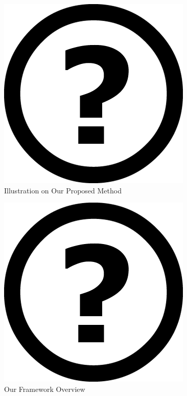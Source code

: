 \documentclass[review]{elsarticle}
\begin{document}
\begin{figure}[H]
	\begin{center}
		\includegraphics[scale=0.5]{Unknown.png}
	\end{center}
	\caption{\label{lbl:Figure_ProposedMethod}Illustration on Our Proposed Method}
\end{figure}


\begin{figure}[H]
	\begin{center}
		\includegraphics[scale=0.5]{Unknown.png}
	\end{center}
	\caption{\label{lbl:Figure_Framework}Our Framework Overview}
\end{figure}
\end{document}
